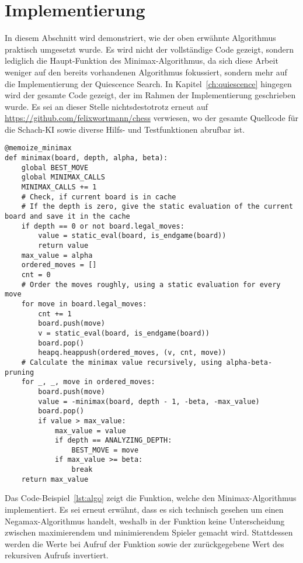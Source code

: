 \section{Implementierung}
In diesem Abschnitt wird demonstriert, wie der oben erwähnte Algorithmus praktisch umgesetzt wurde. Es wird nicht der vollständige Code gezeigt, sondern lediglich die Haupt-Funktion des Minimax-Algorithmus, da sich diese Arbeit weniger auf den bereits vorhandenen Algorithmus fokussiert, sondern mehr auf die Implementierung der Quiescence Search. In Kapitel~\ref{ch:quiescence} hingegen wird der gesamte Code gezeigt, der im Rahmen der Implementierung geschrieben wurde. Es sei an dieser Stelle nichtsdestotrotz erneut auf \url{https://github.com/felixwortmann/chess} verwiesen, wo der gesamte Quellcode für die Schach-KI sowie diverse Hilfs- und Testfunktionen abrufbar ist.

\begin{lstlisting}[caption=Funktion für den Minimax-Algorithmus mit Alpha-Beta-Pruning, label=lst:algo]
@memoize_minimax
def minimax(board, depth, alpha, beta):
    global BEST_MOVE
    global MINIMAX_CALLS
    MINIMAX_CALLS += 1
    # Check, if current board is in cache
    # If the depth is zero, give the static evaluation of the current board and save it in the cache
    if depth == 0 or not board.legal_moves:
        value = static_eval(board, is_endgame(board))
        return value
    max_value = alpha
    ordered_moves = []
    cnt = 0
    # Order the moves roughly, using a static evaluation for every move
    for move in board.legal_moves:
        cnt += 1
        board.push(move)
        v = static_eval(board, is_endgame(board))
        board.pop()
        heapq.heappush(ordered_moves, (v, cnt, move))
    # Calculate the minimax value recursively, using alpha-beta-pruning
    for _, _, move in ordered_moves:
        board.push(move)
        value = -minimax(board, depth - 1, -beta, -max_value)
        board.pop()
        if value > max_value:
            max_value = value
            if depth == ANALYZING_DEPTH:
                BEST_MOVE = move
            if max_value >= beta:
                break
    return max_value
\end{lstlisting}

Das Code-Beispiel~\ref{lst:algo} zeigt die Funktion, welche den Minimax-Algorithmus implementiert. Es sei erneut erwähnt, dass es sich technisch gesehen um einen Negamax-Algorithmus handelt, weshalb in der Funktion keine Unterscheidung zwischen maximierendem und minimierendem Spieler gemacht wird. Stattdessen werden die Werte bei Aufruf der Funktion sowie der zurückgegebene Wert des rekursiven Aufrufs invertiert.


